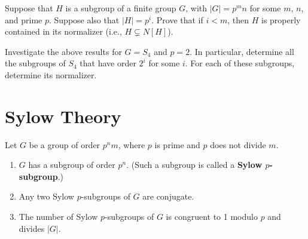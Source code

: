 \begin{problem}\label{prob:hpropinnorm}
Suppose that $H$ is a subgroup of a finite group $G$, with $|G| = p^m n$ for some $m$, $n$, and prime $p$. Suppose also that $\lvert H \rvert = p^i$. Prove that if $i<m$, then $H$ is properly contained in its normalizer (i.e., $H \subsetneq N[H]$).
\end{problem}

\begin{problem}\label{prob:s4subgroups2}
Investigate the above results for $G = S_4$ and $p = 2$.  In particular, determine all the subgroups of $S_4$ that have order $2^i$ for some $i$.  For each of these subgroups, determine its normalizer.
\begin{annotation}
\end{annotation}
\end{problem}


\section{Sylow Theory}

\begin{theorem}\label{thm:sylow}
 Let $G$ be a group of order $p^nm$, where $p$ is prime and $p$ does not divide $m$.
\begin{annotation}
\end{annotation}
 \begin{enumerate}
  \item $G$ has a subgroup of order $p^n$. (Such a subgroup is called a \textbf{Sylow $p$-subgroup}.)
  \item Any two Sylow $p$-subgroups of $G$ are conjugate.
\begin{annotation}
\end{annotation}
  \item The number of Sylow $p$-subgroups of $G$ is congruent to 1 modulo $p$ and divides $\lvert G \rvert$.
 \end{enumerate}
\end{theorem}

